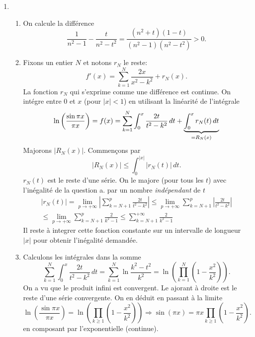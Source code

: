 \begin{enumerate}
 \item
\begin{enumerate}
 \item On calcule la différence
\[
 \frac{1}{n^2 -1} - \frac{t}{n^2 -t^2}= \frac{(n^2+t)(1-t)}{(n^2 -1 )(n^2 -t^2)} > 0.
\]

 \item Fixons un entier $N$ et notons $r_N$ le reste:
\[
 f'(x) = \sum_{k=1}^N\frac{2x}{x^2 - k^2} + r_N(x).
\]
La fonction $r_N$ qui s'exprime comme une différence est continue. On intégre entre $0$ et $x$ (pour $|x| < 1$) en utilisant la linéarité de l'intégrale
\[
 \ln\left(\frac{\sin \pi x}{\pi x} \right) = f(x) = \sum_{k=1}^N\int_0^x\frac{2t}{t^2 - k^2}\,dt + \underset{=R_N(x)}{\underbrace{\int_0^xr_N(t)\,dt}} \\
\]
Majorons $|R_N(x)|$. Commençons par 
\[
 |R_N(x)| \leq \int_0^{|x|}|r_N(t)|\,dt.
\]
$r_N(t)$ est le reste d'une série. On le majore (pour tous les $t$) avec l'inégalité de la question a. par un nombre \emph{indépendant} de $t$
\begin{multline*}
 |r_N(t)| = \underset{p\rightarrow +\infty}{\lim}\left| \sum_{k=N+1}^{p}\frac{2t}{t^2 - k^2}\right|
  \leq \underset{p\rightarrow +\infty}{\lim} \sum_{k=N+1}^{p}\left|\frac{2t}{t^2 - k^2}\right| \\
  \leq \underset{p\rightarrow +\infty}{\lim} \sum_{k=N+1}^{p} \frac{2}{k^2 -1}
\leq \sum_{k=N+1}^{+\infty} \frac{2}{k^2 -1}
\end{multline*}
Il reste à integrer cette fonction constante sur un intervalle de longueur $|x|$ pour obtenir l'inégalité demandée.

 \item Calculons les intégrales dans la somme
\[
 \sum_{k=1}^N\int_0^x\frac{2t}{t^2 - k^2}\,dt 
 =  \sum_{k=1}^{N}\ln \frac{k^2 - t^2}{k^2}
 = \ln\left( \prod_{k=1}^N (1-\frac{x^2}{k^2})\right) .
\]
On a vu que le produit infini est convergent. Le ajorant à droite est le reste d'une série convergente. On en déduit en passant à la limite
\[
 \ln\left(\frac{\sin \pi x}{\pi x} \right) = \ln\left( \prod_{k \geq 1} (1-\frac{x^2}{k^2})\right) 
 \Rightarrow \sin(\pi x) = \pi x \prod_{k \geq 1} (1-\frac{x^2}{k^2}).
\]
en composant par l'exponentielle (continue).
\end{enumerate}
\end{enumerate}
